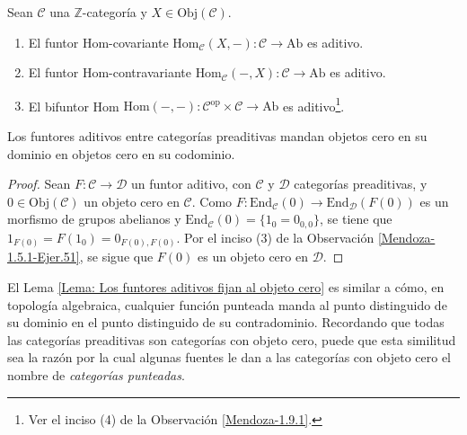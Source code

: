 \documentclass[tesis]{subfiles}
\begin{document}
\begin{Ejem}\label{Mendoza-Ej.55}
    Sean $\mathscr{C}$ una $\mathbb{Z}$-categoría y $X\in\text{Obj}(\mathscr{C})$.
    \begin{enumerate}[label=(\arabic*)]
    
        \item El funtor Hom-covariante $\text{Hom}_\mathscr{C}(X,-):\mathscr{C}\to \text{Ab}$ es aditivo. 

        \item El funtor Hom-contravariante $\text{Hom}_{\mathscr{C}}(-,X):\mathscr{C}\to \text{Ab}$ es aditivo.

        \item El bifuntor Hom $\text{Hom}(-,-):\mathscr{C}^\text{op}\times \mathscr{C}\to \text{Ab}$ es aditivo\footnote{Ver el inciso (4) de la Observación \ref{Mendoza-1.9.1}.}.
    \end{enumerate}
\end{Ejem}


\begin{Lema}\label{Lema: Los funtores aditivos fijan al objeto cero}
    Los funtores aditivos entre categorías preaditivas mandan objetos cero en su dominio en objetos cero en su codominio.
\end{Lema}

\begin{proof}

    Sean $F:\mathscr{C}\to \mathscr{D}$ un funtor aditivo, con $\mathscr{C}$ y $\mathscr{D}$ categorías preaditivas, y $0\in\text{Obj}(\mathscr{C})$ un objeto cero en $\mathscr{C}$. Como $F:\text{End}_\mathscr{C}(0)\to \text{End}_\mathscr{D}(F(0))$ es un morfismo de grupos abelianos y $\text{End}_\mathscr{C}(0) = \{1_0 = 0_{0,0}\}$, se tiene que $1_{F(0)} = F(1_0) = 0_{F(0),F(0)}$. Por el inciso (3) de la Observación \ref{Mendoza-1.5.1-Ejer.51}, se sigue que $F(0)$ es un objeto cero en $\mathscr{D}$.
\end{proof}

\begin{Obs}
    El Lema \ref{Lema: Los funtores aditivos fijan al objeto cero} es similar a cómo, en topología algebraica, cualquier función punteada manda al punto distinguido de su dominio en el punto distinguido de su contradominio. Recordando que todas las categorías preaditivas son categorías con objeto cero, puede que esta similitud sea la razón por la cual algunas fuentes le dan a las categorías con objeto cero el nombre de \emph{categorías punteadas}.
\end{Obs}
\end{document}
